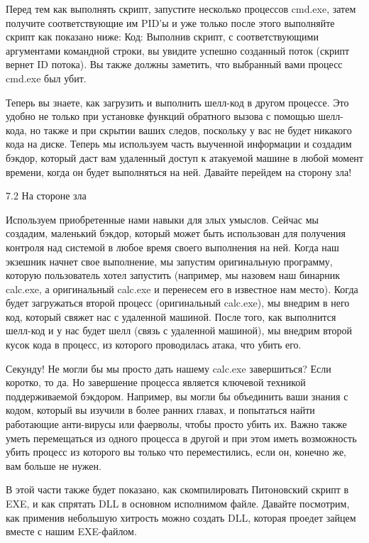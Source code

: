 \documentclass[12pt, a4paper, oneside]{book}
\begin{document}
Перед тем как выполнять скрипт, запустите несколько процессов cmd.exe, затем получите соответствующие им PID’ы и уже только после этого выполняйте скрипт как показано ниже:
Код:
Выполнив скрипт, с соответствующими аргументами командной строки, вы увидите успешно созданный поток (скрипт вернет ID потока). Вы также должны заметить, что выбранный вами процесс cmd.exe был убит.

Теперь вы знаете, как загрузить и выполнить шелл-код в другом процессе. Это удобно не только при установке функций обратного вызова с помощью шелл-кода, но также и при скрытии ваших следов, поскольку у вас не будет никакого кода на диске. Теперь мы используем часть выученной информации и создадим бэкдор, который даст вам удаленный доступ к атакуемой машине в любой момент времени, когда он будет выполняться на ней. Давайте перейдем на сторону зла!


7.2 На стороне зла

Используем приобретенные нами навыки для злых умыслов. Сейчас мы создадим, маленький бэкдор, который может быть использован для получения контроля над системой в любое время своего выполнения на ней. Когда наш экзешник начнет свое выполнение, мы запустим оригинальную программу, которую пользователь хотел запустить (например, мы назовем наш бинарник calc.exe, а оригинальный calc.exe и перенесем его в известное нам место). Когда будет загружаться второй процесс (оригинальный calc.exe), мы внедрим в него код, который свяжет нас с удаленной машиной. После того, как выполнится шелл-код и у нас будет шелл (связь с удаленной машиной), мы внедрим второй кусок кода в процесс, из которого проводилась атака, что убить его. 

Секунду! Не могли бы мы просто дать нашему calc.exe завершиться? Если коротко, то да. Но завершение процесса является ключевой техникой поддерживаемой бэкдором. Например, вы могли бы объединить ваши знания с кодом, который вы изучили в более ранних главах, и попытаться найти работающие анти-вирусы или фаерволы, чтобы просто убить их. Важно также уметь перемещаться из одного процесса в другой и при этом иметь возможность убить процесс из которого вы только что переместились, если он, конечно же, вам больше не нужен. 

В этой части также будет показано, как скомпилировать Питоновский скрипт в EXE, и как спрятать DLL в основном исполнимом файле. Давайте посмотрим, как применив небольшую хитрость можно создать DLL, которая проедет зайцем вместе с нашим EXE-файлом.
\end{document}
